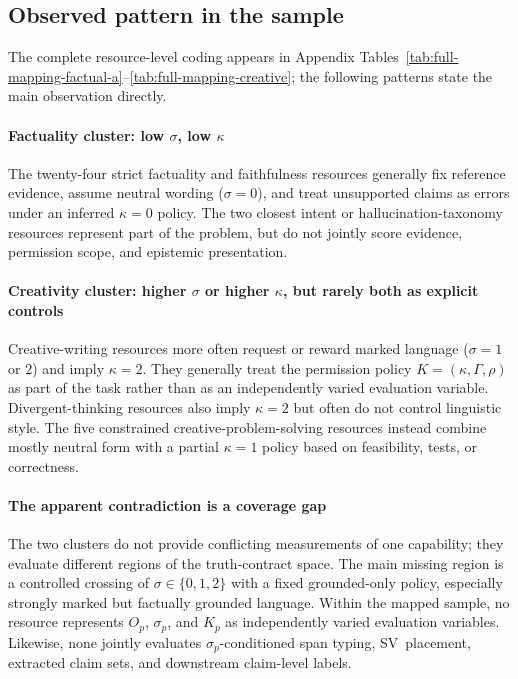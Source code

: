 \documentclass{clv2025}
\newcommand{\SV}{\textsc{SV}}
\begin{document}
\subsection{Observed pattern in the sample}

The complete resource-level coding appears in Appendix Tables~\ref{tab:full-mapping-factual-a}--\ref{tab:full-mapping-creative}; the following patterns state the main observation directly.

\paragraph{Factuality cluster: low $\sigma$, low $\kappa$}
The twenty-four strict factuality and faithfulness resources generally fix reference evidence, assume neutral wording ($\sigma=0$), and treat unsupported claims as errors under an inferred $\kappa=0$ policy.
The two closest intent or hallucination-taxonomy resources represent part of the problem, but do not jointly score evidence, permission scope, and epistemic presentation.

\paragraph{Creativity cluster: higher $\sigma$ or higher $\kappa$, but rarely both as explicit controls}
Creative-writing resources more often request or reward marked language ($\sigma=1$ or $2$) and imply $\kappa=2$.
They generally treat the permission policy $K=(\kappa,\Gamma,\rho)$ as part of the task rather than as an independently varied evaluation variable.
Divergent-thinking resources also imply $\kappa=2$ but often do not control linguistic style.
The five constrained creative-problem-solving resources instead combine mostly neutral form with a partial $\kappa=1$ policy based on feasibility, tests, or correctness.

\paragraph{The apparent contradiction is a coverage gap}
The two clusters do not provide conflicting measurements of one capability; they evaluate different regions of the truth-contract space.
The main missing region is a controlled crossing of $\sigma\in\{0,1,2\}$ with a fixed grounded-only policy, especially strongly marked but factually grounded language.
Within the mapped sample, no resource represents $O_p$, $\sigma_p$, and $K_p$ as independently varied evaluation variables.
Likewise, none jointly evaluates $\sigma_p$-conditioned span typing, \SV\ placement, extracted claim sets, and downstream claim-level labels.
\end{document}
